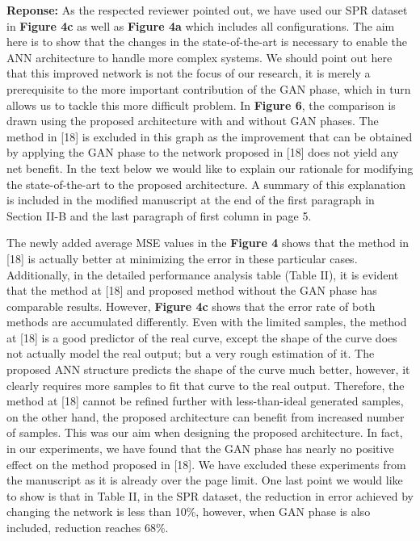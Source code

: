\documentclass{article}
\begin{document}
	\textbf{Reponse: }As the respected reviewer pointed out, we have used our SPR dataset in \textbf{Figure 4c} as well as \textbf{Figure 4a} which includes all configurations. The aim here is to show that the changes in the state-of-the-art is necessary to enable the ANN architecture to handle more complex systems. We should point out here that this improved network is not the focus of our research, it is merely a prerequisite to the more important contribution of the GAN phase, which in turn allows us to tackle this more difficult problem. In \textbf{Figure 6}, the comparison is drawn using the proposed architecture with and without GAN phases. The method in [18] is excluded in this graph as the improvement that can be obtained by applying the GAN phase to the network proposed in [18] does not yield any net benefit. In the text below we would like to explain our rationale for modifying the state-of-the-art to the proposed architecture. A summary of this explanation is included in the modified manuscript at the end of the first paragraph in Section II-B and the last paragraph of first column in page 5.
	
	The newly added average MSE values in the \textbf{Figure 4} shows that the method in [18] is actually better at minimizing the error in these particular cases. Additionally, in the detailed performance analysis table (Table II), it is evident that the method at [18] and proposed method without the GAN phase has comparable results. However, \textbf{Figure 4c} shows that the error rate of both methods are accumulated differently. Even with the limited samples, the method at [18] is a good predictor of the real curve, except the shape of the curve does not actually model the real output; but a very rough estimation of it. The proposed ANN structure predicts the shape of the curve much better, however, it clearly requires more samples to fit that curve to the real output. Therefore, the method at [18] cannot be refined further with less-than-ideal generated samples, on the other hand, the proposed architecture can benefit from increased number of samples. This was our aim when designing the proposed architecture. In fact, in our experiments, we have found that the GAN phase has nearly no positive effect on the method proposed in [18]. We have excluded these experiments from the manuscript as it is already over the page limit. One last point we would like to show is that in Table II, in the SPR dataset, the reduction in error achieved by changing the network is less than 10\%, however, when GAN phase is also included, reduction reaches 68\%.
	
\end{document}
